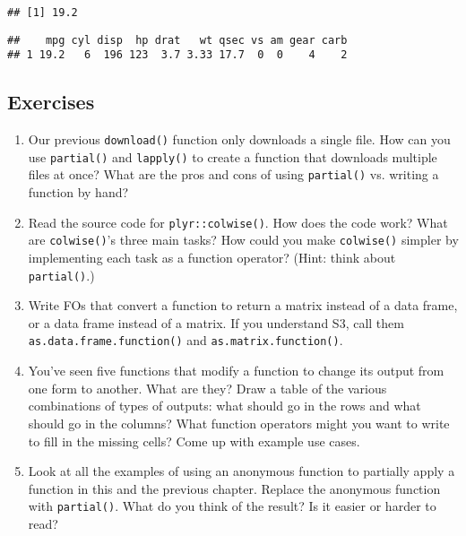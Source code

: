 \begin{itemize}
\begin{verbatim}
## [1] 19.2
\end{verbatim}

\begin{Shaded}
\begin{Highlighting}[]
\OperatorTok{::}
\end{Highlighting}
\end{Shaded}

\begin{verbatim}
##    mpg cyl disp  hp drat   wt qsec vs am gear carb
## 1 19.2   6  196 123  3.7 3.33 17.7  0  0    4    2
\end{verbatim}
\end{itemize}

\hypertarget{exercises-2}{%
\subsection{Exercises}\label{exercises-2}}

\begin{enumerate}
\def\labelenumi{\arabic{enumi}.}
\item
  Our previous \texttt{download()} function only downloads a single
  file. How can you use \texttt{partial()} and \texttt{lapply()} to
  create a function that downloads multiple files at once? What are the
  pros and cons of using \texttt{partial()} vs. writing a function by
  hand?
\item
  Read the source code for \texttt{plyr::colwise()}. How does the code
  work? What are \texttt{colwise()}'s three main tasks? How could you
  make \texttt{colwise()} simpler by implementing each task as a
  function operator? (Hint: think about \texttt{partial()}.)
\item
  Write FOs that convert a function to return a matrix instead of a data
  frame, or a data frame instead of a matrix. If you understand S3, call
  them \texttt{as.data.frame.function()} and
  \texttt{as.matrix.function()}.
\item
  You've seen five functions that modify a function to change its output
  from one form to another. What are they? Draw a table of the various
  combinations of types of outputs: what should go in the rows and what
  should go in the columns? What function operators might you want to
  write to fill in the missing cells? Come up with example use cases.
\item
  Look at all the examples of using an anonymous function to partially
  apply a function in this and the previous chapter. Replace the
  anonymous function with \texttt{partial()}. What do you think of the
  result? Is it easier or harder to read?
\end{enumerate}

